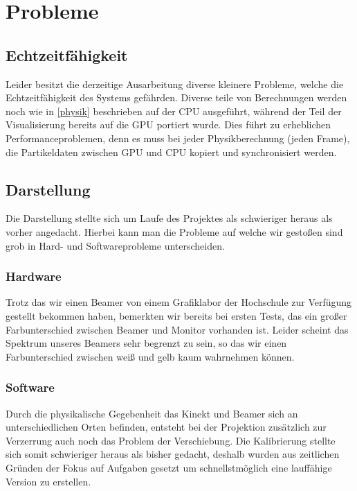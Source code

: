 \chapter{Probleme}
	\begin{Spacing}{\mylinespace}
	\section{Echtzeitfähigkeit}
	
		Leider besitzt die derzeitige Ausarbeitung diverse kleinere Probleme, welche die Echtzeitfähigkeit des Systems gefährden.
		Diverse teile von Berechnungen werden noch wie in \ref{physik} beschrieben auf der CPU ausgeführt, während der Teil der Visualisierung bereits auf die GPU portiert wurde.
		Dies führt zu erheblichen Performanceproblemen, denn es muss bei jeder Physikberechnung (jeden Frame), die Partikeldaten zwischen GPU und CPU kopiert und synchronisiert werden.
	\section{Darstellung}
		Die Darstellung stellte sich um Laufe des Projektes als schwieriger heraus als vorher angedacht.
		Hierbei kann man die Probleme auf welche wir gestoßen sind grob in Hard- und Softwareprobleme unterscheiden.
		\subsection{Hardware}
			Trotz das wir einen Beamer von einem Grafiklabor der Hochschule zur Verfügung gestellt bekommen haben, bemerkten wir bereits bei ersten Tests, das ein großer Farbunterschied zwischen Beamer und
			Monitor vorhanden ist. Leider scheint das Spektrum unseres Beamers sehr begrenzt zu sein, so das wir einen Farbunterschied zwischen weiß und gelb kaum wahrnehmen können.		
		\subsection{Software}
			Durch die physikalische Gegebenheit das Kinekt und Beamer sich an unterschiedlichen Orten befinden, entsteht bei der Projektion zusätzlich zur Verzerrung auch noch das Problem der Verschiebung.
			Die Kalibrierung stellte sich somit schwieriger heraus als bisher gedacht, deshalb wurden aus zeitlichen Gründen der Fokus auf Aufgaben gesetzt um schnellstmöglich eine lauffähige Version zu erstellen.
	
\end{Spacing}
\newpage
\clearpage
